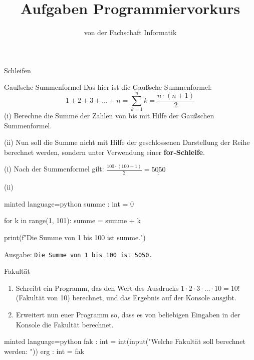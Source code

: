 
\title{Aufgaben Programmiervorkurs}
\subtitle{von der Fachschaft Informatik\hfill\ptitle}

\maketitle{}

\begin{task}[points=auto]{Schleifen}
    \begin{subtask*}[points=0]{Gaußsche Summenformel }
        Das hier ist die Gaußsche Summenformel:
        $$1+2+3+\ldots+n = \sum_{k=1}^nk=\frac{n\cdot(n+1)}{2}$$
        (i) Berechne die Summe der Zahlen von  bis  mit Hilfe der Gaußschen Summenformel.

        (ii) Nun soll die Summe nicht mit Hilfe der geschlossenen Darstellung der Reihe berechnet werden, sondern unter Verwendung einer \textbf{for-Schleife}.

        \begin{solution}
            (i) Nach der Summenformel gilt: $\frac{100\cdot(100+1)}{2} = \underline{\underline{5050}}$

            (ii) \begin{codeBlock}[]{minted language=python}
                summe : int = 0

                for k in range(1, 101):
                    summe = summe + k

                print(f"Die Summe von 1 bis 100 ist {summe}.")
            \end{codeBlock}
            Ausgabe: \texttt{Die Summe von 1 bis 100 ist 5050.}
        \end{solution}
    \end{subtask*}
    \begin{subtask*}[points=0]{Fakultät }
        \begin{enumerate}
            \item Schreibt ein Programm, das den Wert des Ausdrucks $1 \cdot 2 \cdot 3 \cdot \ldots \cdot 10 = 10!$ (Fakultät von 10) berechnet, und das Ergebnis auf der Konsole ausgibt.
            \item Erweitert nun euer Programm so, dass es von beliebigen Eingaben in der Konsole die Fakultät berechnet.
        \end{enumerate}

        \begin{solution}
            \begin{codeBlock}[]{minted language=python}
            fak : int = int(input("Welche Fakultät soll berechnet werden: "))
            erg : int = fak


\end{codeBlock}
\end{solution}
\end{subtask*}
\end{task}
